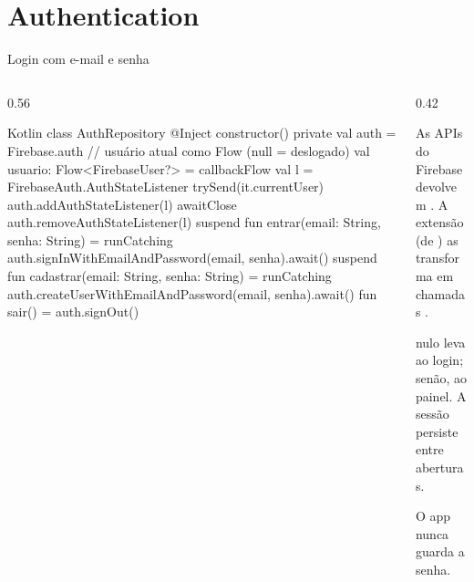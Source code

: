 \documentclass[aspectratio=169,10pt]{beamer}
\begin{document}
\section{Authentication}

\begin{frame}[fragile]{Login com e-mail e senha}
  \begin{columns}[T]
    \begin{column}{0.56\textwidth}
\begin{codigo}[title=AuthRepository.kt]{Kotlin}
class AuthRepository @Inject constructor() {
  private val auth = Firebase.auth
  // usuário atual como Flow (null = deslogado)
  val usuario: Flow<FirebaseUser?> = callbackFlow {
    val l = FirebaseAuth.AuthStateListener {
      trySend(it.currentUser)
    }
    auth.addAuthStateListener(l)
    awaitClose { auth.removeAuthStateListener(l) }
  }
  suspend fun entrar(email: String, senha: String) = runCatching {
    auth.signInWithEmailAndPassword(email, senha).await()
  }
  suspend fun cadastrar(email: String, senha: String) = runCatching {
    auth.createUserWithEmailAndPassword(email, senha).await()
  }
  fun sair() = auth.signOut()
}
\end{codigo}
    \end{column}
    \begin{column}{0.42\textwidth}
      \begin{conceito}
        As APIs do Firebase devolvem . A extensão  (de ) as transforma em chamadas .
      \end{conceito}
      \begin{dica}
         nulo leva ao login; senão, ao painel. A sessão persiste entre aberturas.
      \end{dica}
      \begin{atencao}
        O app nunca guarda a senha.
      \end{atencao}
    \end{column}
  \end{columns}
\end{frame}
\end{document}
